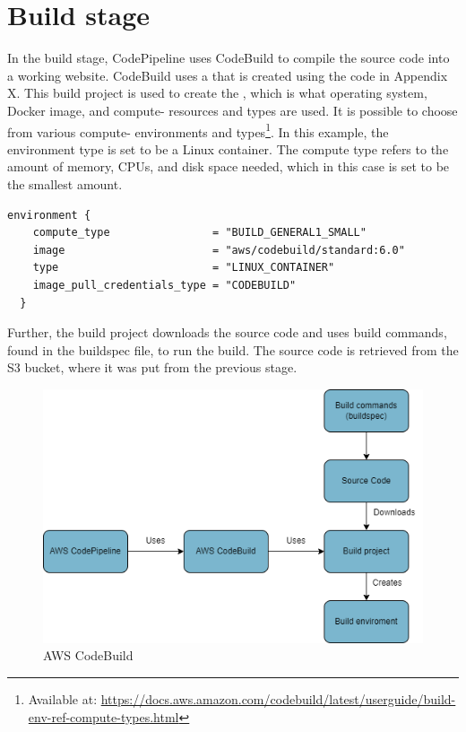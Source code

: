 \section{Build stage}
In the build stage, CodePipeline uses CodeBuild to compile the source code into a working website. CodeBuild uses a  that is created using the code in Appendix X. This build project is used to create the , which is what operating system, Docker image, and compute- resources and types are used.  It is possible to choose from various compute- environments and types\footnote{Available at: \url{https://docs.aws.amazon.com/codebuild/latest/userguide/build-env-ref-compute-types.html}}. In this example, the environment type is set to be a Linux container. The compute type refers to the amount of memory, CPUs, and disk space needed, which in this case is set to be the smallest amount. 

\begin{tcolorbox}
\begin{verbatim}
environment {
    compute_type                = "BUILD_GENERAL1_SMALL"
    image                       = "aws/codebuild/standard:6.0"
    type                        = "LINUX_CONTAINER"
    image_pull_credentials_type = "CODEBUILD"
  }
\end{verbatim}
\end{tcolorbox}

Further, the build project downloads the source code and uses build commands, found in the \gls{buildspec} file, to run the build. The source code is retrieved from the S3 bucket, where it was put from the previous stage. \cite{CodeBuildProcess}

\vspace{2mm}
\begin{figure}[H]
    \centering
    \includegraphics[scale=0.4]{Images/CodeBuild.drawio.png}
    \caption{AWS CodeBuild} 
    \label{fig: AWS CodeBuild}
\end{figure}

